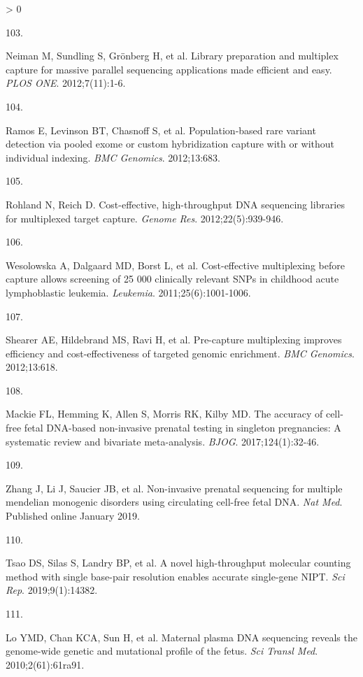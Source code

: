 \documentclass[11pt,letterpaper,oneside]{book}
\newlength{\cslhangindent}
\newlength{\csllabelwidth}
\newenvironment{CSLReferences}[3] %
 {%
  \setlength{\parindent}{0pt}
  \ifodd #1 \everypar{\setlength{\hangindent}{\cslhangindent}}\ignorespaces\fi
  \ifnum #2 > 0
  \setlength{\parskip}{#2\baselineskip}
  \fi
 }%
 {}
\newcommand{\CSLLeftMargin}[1]{\parbox[t]{\maxof{\widthof{#1}}{\csllabelwidth}}{#1}}
\newcommand{\CSLRightInline}[1]{\parbox[t]{\linewidth-\csllabelwidth}{#1}\newline}
\begin{document}
\begin{CSLReferences}{0}{0}
\leavevmode\hypertarget{ref-neiman:2012aa}{}%
\CSLLeftMargin{103. }
\CSLRightInline{Neiman M, Sundling S, Grönberg H, et al. Library preparation and multiplex capture for massive parallel sequencing applications made efficient and easy. \emph{PLOS ONE}. 2012;7(11):1-6.}

\leavevmode\hypertarget{ref-ramos:2012aa}{}%
\CSLLeftMargin{104. }
\CSLRightInline{Ramos E, Levinson BT, Chasnoff S, et al. Population-based rare variant detection via pooled exome or custom hybridization capture with or without individual indexing. \emph{BMC Genomics}. 2012;13:683.}

\leavevmode\hypertarget{ref-rohland:2012aa}{}%
\CSLLeftMargin{105. }
\CSLRightInline{Rohland N, Reich D. Cost-effective, high-throughput DNA sequencing libraries for multiplexed target capture. \emph{Genome Res}. 2012;22(5):939-946.}

\leavevmode\hypertarget{ref-wesolowska:2011aa}{}%
\CSLLeftMargin{106. }
\CSLRightInline{Wesolowska A, Dalgaard MD, Borst L, et al. Cost-effective multiplexing before capture allows screening of 25 000 clinically relevant SNPs in childhood acute lymphoblastic leukemia. \emph{Leukemia}. 2011;25(6):1001-1006.}

\leavevmode\hypertarget{ref-shearer:2012aa}{}%
\CSLLeftMargin{107. }
\CSLRightInline{Shearer AE, Hildebrand MS, Ravi H, et al. Pre-capture multiplexing improves efficiency and cost-effectiveness of targeted genomic enrichment. \emph{BMC Genomics}. 2012;13:618.}

\leavevmode\hypertarget{ref-mackie:2017aa}{}%
\CSLLeftMargin{108. }
\CSLRightInline{Mackie FL, Hemming K, Allen S, Morris RK, Kilby MD. The accuracy of cell-free fetal DNA-based non-invasive prenatal testing in singleton pregnancies: A systematic review and bivariate meta-analysis. \emph{BJOG}. 2017;124(1):32-46.}

\leavevmode\hypertarget{ref-zhang:2019aa}{}%
\CSLLeftMargin{109. }
\CSLRightInline{Zhang J, Li J, Saucier JB, et al. Non-invasive prenatal sequencing for multiple mendelian monogenic disorders using circulating cell-free fetal DNA. \emph{Nat Med}. Published online January 2019.}

\leavevmode\hypertarget{ref-tsao:2019ab}{}%
\CSLLeftMargin{110. }
\CSLRightInline{Tsao DS, Silas S, Landry BP, et al. A novel high-throughput molecular counting method with single base-pair resolution enables accurate single-gene NIPT. \emph{Sci Rep}. 2019;9(1):14382.}

\leavevmode\hypertarget{ref-lo:2010aa}{}%
\CSLLeftMargin{111. }
\CSLRightInline{Lo YMD, Chan KCA, Sun H, et al. Maternal plasma DNA sequencing reveals the genome-wide genetic and mutational profile of the fetus. \emph{Sci Transl Med}. 2010;2(61):61ra91.}


\end{CSLReferences}
\end{document}
